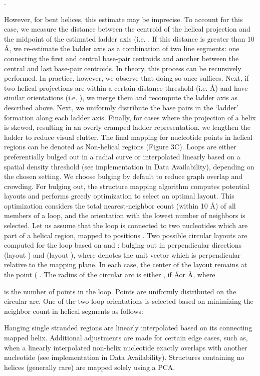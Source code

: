 .

However, for bent helices, this estimate may be imprecise. To account for this case, we measure the distance
 between the centroid of the helical projection and the midpoint of the estimated ladder axis (i.e.
. If this distance is greater than 10 Å, we re-estimate the ladder axis as a combination of two line segments: one connecting the first and central base-pair centroids and another between the central and last base-pair centroids. In theory, this process can be recursively performed. In practice, however, we observe that doing so once suffices. Next, if two helical projections are within a certain distance threshold (i.e.
Å) and have similar orientations (i.e.
), we merge them and recompute the ladder axis as described above. Next, we uniformly distribute the base pairs in the ‘ladder’ formation along each ladder axis. Finally, for cases where the projection of a helix is skewed, resulting in an overly cramped ladder representation, we lengthen the ladder to reduce visual clutter. The final mapping for nucleotide points in helical regions can be denoted as Non-helical regions (Figure 3C). Loops are either preferentially bulged out in a radial curve or interpolated linearly based on a spatial density threshold (see implementation in Data Availability), depending on the chosen setting. We choose bulging by default to reduce graph overlap and crowding. For bulging out, the structure mapping algorithm computes potential layouts and performs greedy optimization to select an optimal layout. This optimization considers the total nearest-neighbor count (within 10 Å) of all members of a loop, and the orientation with the lowest number of neighbors is selected. Let us assume that the loop is connected to two nucleotides which are part of a helical region, mapped to positions
. Two possible circular layouts are computed for the loop based on
and
: bulging out in perpendicular directions
(layout ) and
(layout ), where
denotes the unit vector which is perpendicular relative to the mapping plane. In each case, the center of the layout remains at the point (
. The radius of the circular arc is either 
, if
 \AA or
 \AA, where

is the number of points in the loop. Points are uniformly distributed on the circular arc. One of the two loop orientations is selected based on minimizing the neighbor count in helical segments as follows:

Hanging single stranded regions are linearly interpolated based on its connecting mapped helix. Additional adjustments are made for certain edge cases, such as, when a linearly interpolated non-helix nucleotide exactly overlaps with another nucleotide (see implementation in Data Availability). Structures containing no helices (generally rare) are mapped solely using a PCA.

